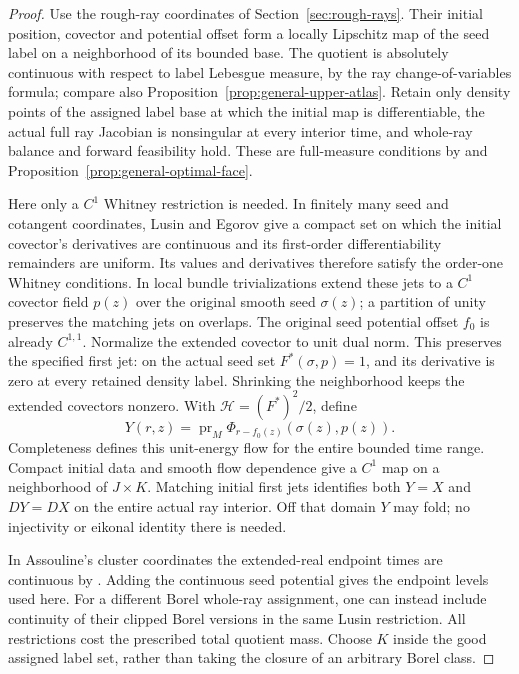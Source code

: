 \documentclass[11pt,reqno]{amsart}
\theoremstyle{definition}
\theoremstyle{remark}
\numberwithin{equation}{section}
\begin{document}
\begin{proof}
Use the rough-ray coordinates of Section~\ref{sec:rough-rays}.
Their initial position, covector and potential offset form a locally
Lipschitz map of the seed label on a neighborhood of its bounded base.
The quotient is absolutely continuous with respect to label Lebesgue
measure, by the ray change-of-variables formula; compare also
Proposition~\ref{prop:general-upper-atlas}. Retain only density points
of the assigned label base at which the initial map is differentiable,
the actual full ray Jacobian is
nonsingular at every interior time, and whole-ray balance and forward
feasibility hold. These are full-measure conditions by
\cite[Proposition~4.18 and Lemma~4.21]{Assouline} and
Proposition~\ref{prop:general-optimal-face}.

Here only a \(C^1\) Whitney restriction is needed. In finitely many
seed and cotangent coordinates, Lusin and Egorov give a compact set
on which the initial covector's derivatives are continuous and its
first-order differentiability remainders are uniform. Its values and
derivatives therefore satisfy the order-one Whitney conditions.
In local bundle trivializations extend these jets to a \(C^1\)
covector field \(p(z)\) over the original smooth seed \(\sigma(z)\);
a partition of unity preserves the matching jets on overlaps.
The original seed potential offset \(f_0\) is already \(C^{1,1}\).
Normalize the extended covector to unit dual norm. This preserves
the specified first jet: on the actual seed set
\(F^*(\sigma,p)=1\), and its derivative is zero at every retained
density label. Shrinking the neighborhood keeps the extended covectors
nonzero. With \(\mathcal H=(F^*)^2/2\), define
\begin{equation}
\label{eq:compact-conditional-flow}
 Y(r,z)=\operatorname{pr}_M
          \Phi_{r-f_0(z)}(\sigma(z),p(z)).
\end{equation}
Completeness defines this unit-energy flow for the entire bounded
time range. Compact initial data and smooth flow dependence give a
\(C^1\) map on a neighborhood of \(J\times K\). Matching initial
first jets identifies both \(Y=X\) and \(DY=DX\) on the entire
actual ray interior. Off that domain \(Y\) may fold; no injectivity
or eikonal identity there is needed.

In Assouline's cluster coordinates the extended-real endpoint times
are continuous by \cite[Definition~4.16(iii) and
Proposition~4.18(i)]{Assouline}. Adding the continuous seed potential
gives the endpoint levels used here. For a different Borel whole-ray
assignment, one can instead include continuity of their clipped Borel
versions in the same Lusin restriction. All restrictions cost the
prescribed total quotient mass. Choose \(K\) inside the good assigned
label set, rather than taking the closure of an arbitrary Borel class.


\end{proof}
\end{document}
